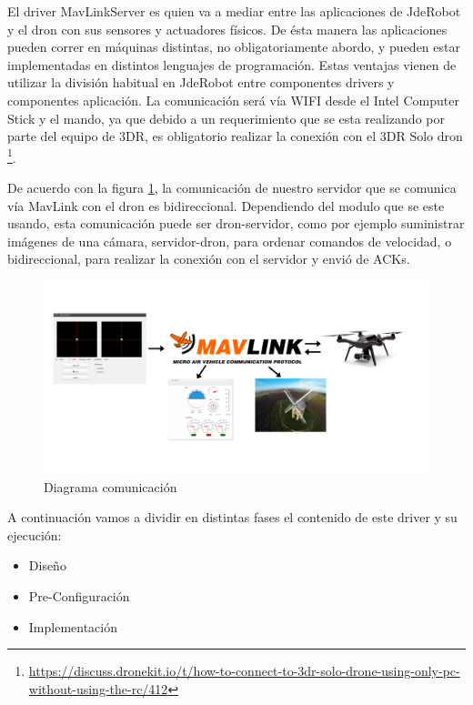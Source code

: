 El driver MavLinkServer es quien va a mediar entre las aplicaciones de JdeRobot y el dron con sus sensores y actuadores físicos. De ésta manera las aplicaciones pueden correr en máquinas distintas, no obligatoriamente abordo, y pueden estar implementadas en distintos lenguajes de programación. Estas ventajas vienen de utilizar la división habitual en JdeRobot entre componentes drivers y componentes aplicación. La comunicación será vía WIFI desde el Intel Computer Stick y el mando, ya que debido a un requerimiento que se esta realizando por parte del equipo de 3DR, es obligatorio realizar la conexión con el 3DR Solo dron \footnote{\url{https://discuss.dronekit.io/t/how-to-connect-to-3dr-solo-drone-using-only-pc-without-using-the-rc/412}}.

De acuerdo con la figura \ref{fig:diagramaComunicacionServerDron1}, la comunicación de nuestro servidor que se comunica vía MavLink con el dron es bidireccional. Dependiendo del modulo que se este usando, esta comunicación puede ser dron-servidor, como por ejemplo suministrar imágenes de una cámara, servidor-dron, para ordenar comandos de velocidad, o bidireccional, para realizar la conexión con el servidor y envió de ACKs. 

\begin{figure}[H]
  \centering
  \includegraphics[scale=0.1]{imagenes/diagramaComunicacionServerDron1.png}
  \caption{Diagrama comunicación}
  \label{fig:diagramaComunicacionServerDron1}
\end{figure}


A continuación vamos a dividir en distintas fases el contenido de este driver y su ejecución:

\begin{itemize}
\item Diseño
\item Pre-Configuración
\item Implementación
\end{itemize}

